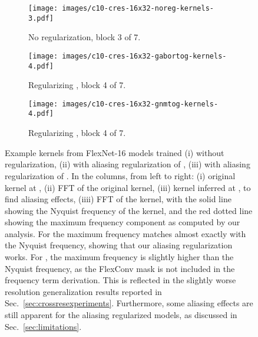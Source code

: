\documentclass{article} \usepackage{iclr2022_conference,times}
\begin{document}
\begin{figure}
    \centering
\begin{subfigure}[c]{0.98\textwidth}
     \vspace{2.5mm}
         \centering
         \texttt{[image: images/c10-cres-16x32-noreg-kernels-3.pdf]}
\label{fig:c10-cres-noreg-kernels-1}
         \vspace{-3mm}
         \caption{No regularization, block 3 of 7.}
     \end{subfigure}
\begin{subfigure}[c]{0.98\textwidth}
     \vspace{2.5mm}
         \centering
         \texttt{[image: images/c10-cres-16x32-gabortog-kernels-4.pdf]}
\label{fig:c10-cres-gabor-kernels-1}
         \vspace{-3mm}
         \caption{Regularizing , block 4 of 7.}
     \end{subfigure}
\begin{subfigure}[c]{0.98\textwidth}
     \vspace{2.5mm}
         \centering
         \texttt{[image: images/c10-cres-16x32-gnmtog-kernels-4.pdf]}
         \label{fig:c10-cres-gabor-kernels-1}
         \vspace{-3mm}
         \caption{Regularizing , block 4 of 7.}
     \end{subfigure}
    \caption{Example kernels from FlexNet-16 models trained (i) without regularization, (ii) with aliasing regularization of , (iii) with aliasing regularization of . In the columns, from left to right: (i) original kernel at , (ii) FFT of the original kernel, (iii) kernel inferred at , to find aliasing effects, (iiii) FFT of the  kernel, with the solid line showing the Nyquist frequency of the  kernel, and the red dotted line showing the maximum frequency component as computed by our analysis. For  the maximum frequency matches almost exactly with the Nyquist frequency, showing that our aliasing regularization works. For , the maximum frequency is slightly higher than the Nyquist frequency, as the FlexConv mask is not included in the frequency term derivation. This is reflected in the slightly worse resolution generalization results reported in Sec.~\ref{sec:crossresexperiments}. Furthermore, some aliasing effects are still apparent for the aliasing regularized models, as discussed in Sec.~\ref{sec:limitations}.
    \vspace{-2mm}}
    \label{fig:app-cifar10kernelfrequencies}
\end{figure}
\end{document}
